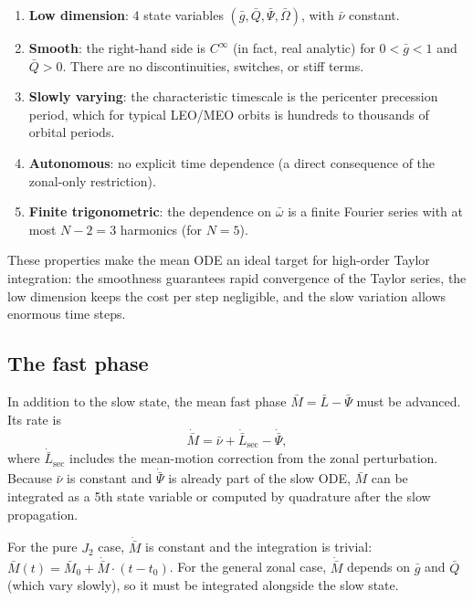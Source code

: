 \documentclass[11pt]{article}
\begin{document}
\begin{enumerate}
\item \textbf{Low dimension}: 4 state variables
$(\bar g, \bar Q, \bar\Psi, \bar\Omega)$, with $\bar\nu$ constant.

\item \textbf{Smooth}: the right-hand side is $C^\infty$ (in fact, real
analytic) for $0 < \bar g < 1$ and $\bar Q > 0$. There are no
discontinuities, switches, or stiff terms.

\item \textbf{Slowly varying}: the characteristic timescale is the
pericenter precession period, which for typical LEO/MEO orbits is hundreds
to thousands of orbital periods.

\item \textbf{Autonomous}: no explicit time dependence (a direct consequence
of the zonal-only restriction).

\item \textbf{Finite trigonometric}: the dependence on $\bar\omega$ is a
finite Fourier series with at most $N - 2 = 3$ harmonics (for $N = 5$).
\end{enumerate}

These properties make the mean ODE an ideal target for high-order Taylor
integration: the smoothness guarantees rapid convergence of the Taylor
series, the low dimension keeps the cost per step negligible, and the slow
variation allows enormous time steps.

\subsection{The fast phase}

In addition to the slow state, the mean fast phase
$\bar M = \bar L - \bar\Psi$ must be advanced. Its rate is
\begin{equation}
\dot{\bar M}
= \bar\nu
+ \dot{\bar L}_{\mathrm{sec}} - \dot{\bar\Psi},
\end{equation}
where $\dot{\bar L}_{\mathrm{sec}}$ includes the mean-motion correction
from the zonal perturbation. Because $\bar\nu$ is constant and
$\dot{\bar\Psi}$ is already part of the slow ODE, $\bar M$ can be integrated
as a 5th state variable or computed by quadrature after the slow propagation.

For the pure $J_2$ case, $\dot{\bar M}$ is constant and the integration is
trivial: $\bar M(t) = \bar M_0 + \dot{\bar M} \cdot (t - t_0)$. For the
general zonal case, $\dot{\bar M}$ depends on $\bar g$ and $\bar Q$ (which
vary slowly), so it must be integrated alongside the slow state.
\end{document}
